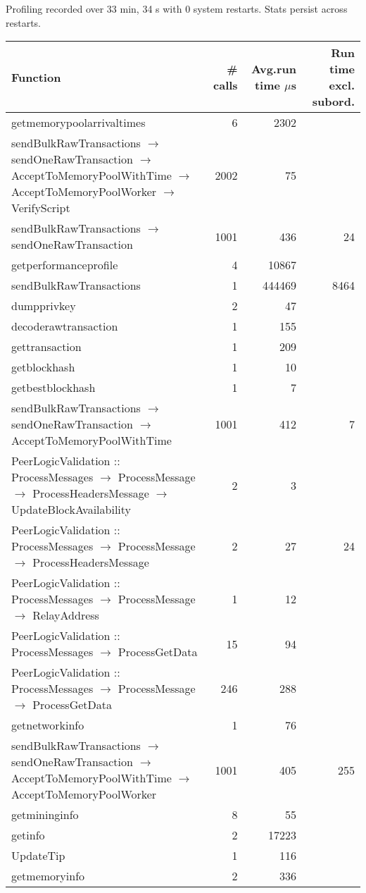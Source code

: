 \documentclass{article}
\begin{document}
Profiling recorded over 33 min, 34 s with 0 system restarts. Stats persist across restarts.

\begin{tabular}{P{5cm}|r|r|r}
Function&\# calls& Avg.run time $\mu$s& Run time excl. subord. \\\hline
getmemorypoolarrivaltimes& 6& 2302&\\\hline
sendBulkRawTransactions $\to$ sendOneRawTransaction $\to$ AcceptToMemoryPoolWithTime $\to$ AcceptToMemoryPoolWorker $\to$ VerifyScript& 2002& 75&\\\hline
sendBulkRawTransactions $\to$ sendOneRawTransaction& 1001& 436&24\\\hline
getperformanceprofile& 4& 10867&\\\hline
sendBulkRawTransactions& 1& 444469&8464\\\hline
dumpprivkey& 2& 47&\\\hline
decoderawtransaction& 1& 155&\\\hline
gettransaction& 1& 209&\\\hline
getblockhash& 1& 10&\\\hline
getbestblockhash& 1& 7&\\\hline
sendBulkRawTransactions $\to$ sendOneRawTransaction $\to$ AcceptToMemoryPoolWithTime& 1001& 412&7\\\hline
PeerLogicValidation :: ProcessMessages $\to$ ProcessMessage $\to$ ProcessHeadersMessage $\to$ UpdateBlockAvailability& 2& 3&\\\hline
PeerLogicValidation :: ProcessMessages $\to$ ProcessMessage $\to$ ProcessHeadersMessage& 2& 27&24\\\hline
PeerLogicValidation :: ProcessMessages $\to$ ProcessMessage $\to$ RelayAddress& 1& 12&\\\hline
PeerLogicValidation :: ProcessMessages $\to$ ProcessGetData& 15& 94&\\\hline
PeerLogicValidation :: ProcessMessages $\to$ ProcessMessage $\to$ ProcessGetData& 246& 288&\\\hline
getnetworkinfo& 1& 76&\\\hline
sendBulkRawTransactions $\to$ sendOneRawTransaction $\to$ AcceptToMemoryPoolWithTime $\to$ AcceptToMemoryPoolWorker& 1001& 405&255\\\hline
getmininginfo& 8& 55&\\\hline
getinfo& 2& 17223&\\\hline
UpdateTip& 1& 116&\\\hline
getmemoryinfo& 2& 336&\\\hline

\end{tabular}
\end{document}
